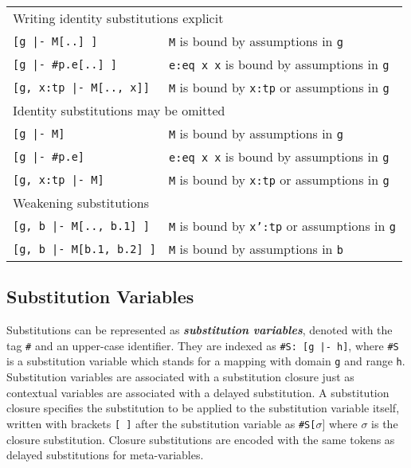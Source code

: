 \documentclass[11pt]{article}
\begin{document}
\begin{center}
\begin{tabular}{ l l}
\multicolumn{2}{l}{Writing identity substitutions explicit}\\[0.5em]
\texttt{[g |- M[..] ]} & \texttt{M} is bound by assumptions in \texttt{g}\\
\texttt{[g |- \#p.e[..] ]} & \texttt{e:eq x x} is bound by assumptions in \texttt{g}\\
\texttt{[g, x:tp |- M[.., x]]} & \texttt{M} is bound by \texttt{x:tp} or assumptions in \texttt{g} \\[1em]
\multicolumn{2}{l}{Identity substitutions may be omitted}\\[0.5em]
\texttt{[g |- M]} & \texttt{M} is bound by assumptions in \texttt{g}\\
\texttt{[g |- \#p.e]} & \texttt{e:eq x x} is bound by assumptions in \texttt{g}\\
\texttt{[g, x:tp |- M]} & \texttt{M} is bound by \texttt{x:tp} or assumptions in \texttt{g} \\[1em]
\multicolumn{2}{l}{Weakening substitutions}\\[0.5em]
\texttt{[g, b |- M[.., b.1] ]} & \texttt{M} is bound by \texttt{x':tp} or assumptions in \texttt{g} \\
\texttt{[g, b |- M[b.1, b.2] ]} & \texttt{M} is bound by assumptions in \texttt{b} \\
\end{tabular}  
\end{center}



\subsection{Substitution Variables}
Substitutions can be represented as \textit{\textbf{substitution variables}}, denoted with the tag \texttt{\#} and an upper-case identifier. They are indexed as \texttt{\#S: [g |- h]}, where \texttt{\#S} is a substitution variable which stands for a mapping with domain \texttt{g} and range \texttt{h}. Substitution variables are associated with a substitution closure just as contextual variables are associated with a delayed substitution. A substitution closure specifies the substitution to be applied to the substitution variable itself, written with brackets \texttt{[ ]} after the substitution variable as \texttt{\#S[}$\sigma${]} where $\sigma$ is the closure substitution. Closure substitutions are encoded with the same tokens as delayed substitutions for meta-variables.
\end{document}
